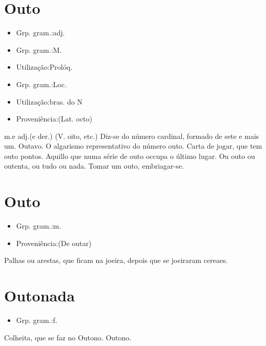 \section{Outo}
\begin{itemize}
\item {Grp. gram.:adj.}
\end{itemize}
\begin{itemize}
\item {Grp. gram.:M.}
\end{itemize}
\begin{itemize}
\item {Utilização:Prolóq.}
\end{itemize}
\begin{itemize}
\item {Grp. gram.:Loc.}
\end{itemize}
\begin{itemize}
\item {Utilização:bras. do N}
\end{itemize}
\begin{itemize}
\item {Proveniência:(Lat. \textunderscore octo\textunderscore )}
\end{itemize}
\textunderscore m.\textunderscore  e \textunderscore adj.\textunderscore  (e der.)
(V. \textunderscore oito\textunderscore , etc.)
Diz-se do número cardinal, formado de sete e mais um.
Outavo.
O algarismo representativo do número outo.
Carta de jogar, que tem outo pontos.
Aquillo que numa série de outo occupa o último lugar.
\textunderscore Ou outo ou outenta\textunderscore , ou tudo ou nada.
\textunderscore Tomar um outo\textunderscore , embriagar-se.
\section{Outo}
\begin{itemize}
\item {Grp. gram.:m.}
\end{itemize}
\begin{itemize}
\item {Proveniência:(De \textunderscore outar\textunderscore )}
\end{itemize}
Palhas ou arestas, que ficam na joeira, depois que se joeiraram cereaes.
\section{Outonada}
\begin{itemize}
\item {Grp. gram.:f.}
\end{itemize}
Colheita, que se faz no Outono.
Outono.
